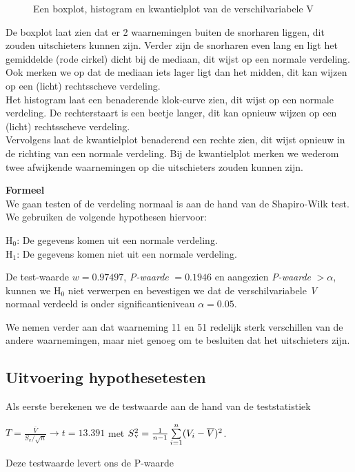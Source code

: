 \documentclass[11pt]{article}
\def\SPSB#1#2{\rlap{\SP{#1}}\SB{#2}}
\def\SP#1{\textsuperscript{#1}}
\def\SB#1{\textsubscript{#1}}
\begin{document}
\begin{figure}[h!]
\caption{Een boxplot, histogram en kwantielplot van de verschilvariabele V}
\label{fig:Graph}
\end{figure}

De boxplot laat zien dat er 2 waarnemingen buiten de snorharen liggen, dit zouden uitschieters kunnen zijn. Verder zijn de snorharen even lang en ligt het gemiddelde (rode cirkel) dicht bij de mediaan, dit wijst op een normale verdeling. Ook merken we op dat de mediaan iets lager ligt dan het midden, dit kan wijzen op een (licht) rechtsscheve verdeling. \\
\-\hspace{0.5cm}Het histogram laat een benaderende klok-curve zien, dit wijst op een normale verdeling. De rechterstaart is een beetje langer, dit kan opnieuw wijzen op een (licht) rechtsscheve verdeling.\\
\-\hspace{0.5cm}Vervolgens laat de kwantielplot benaderend een rechte zien, dit wijst opnieuw in de richting van een normale verdeling. Bij de kwantielplot merken we wederom twee afwijkende waarnemingen op die uitschieters zouden kunnen zijn.

\textbf{Formeel}\\
We gaan testen of de verdeling normaal is aan de hand van de Shapiro-Wilk test. We gebruiken de volgende hypothesen hiervoor:

\begin{center}
H${_0}$: De gegevens komen uit een normale verdeling. \\
H${_1}$: De gegevens komen niet uit een normale verdeling.
\end{center}

De test-waarde $w=0.97497$, {\it P-waarde} $= 0.1946$ en aangezien {\it P-waarde} $> \alpha$, kunnen we H$_{0}$ niet verwerpen en bevestigen we dat de verschilvariabele {\it V} normaal verdeeld is onder significantieniveau $\alpha = 0.05$.

We nemen verder aan dat waarneming 11 en 51 redelijk sterk verschillen van de andere waarnemingen, maar niet genoeg om te besluiten dat het uitschieters zijn.

\subsection{Uitvoering hypothesetesten}
Als eerste berekenen we de testwaarde aan de hand van de teststatistiek
\begin{center}
$T = \frac{\overline{V}}{S_{v}/\sqrt{n}} \rightarrow t = 13.391$ met $S\SPSB{2}{v}=\frac{1}{n-1} \sum\limits_{i=1}^n (V_{i} - \overline{V})^{2}$.
\end{center}
Deze testwaarde levert ons de P-waarde
\end{document}
